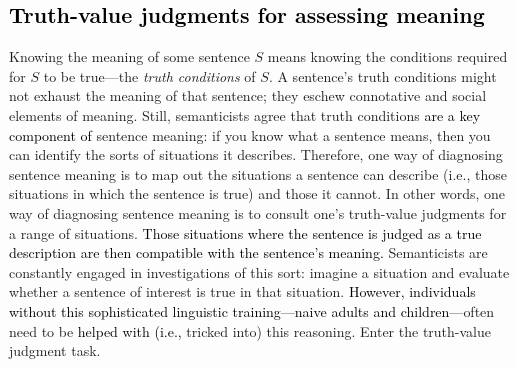 \documentclass[cm]{glossa}
\newcommand{\gcs}[1]{\textcolor{blue}{[gcs: #1]}}
\newcommand{\lsp}[1]{\textcolor{red}{[lsp: #1]}}
\newcommand{\lp}[1]{\textcolor{black}{#1}} %
\begin{document}
\subsection{\lp{Truth-value judgments for assessing meaning}}
Knowing the meaning of some sentence $S$ means knowing the conditions required for $S$ to be true---the \emph{truth conditions} of $S$. A sentence's truth conditions might not exhaust the meaning of that sentence; they eschew connotative and social elements of meaning.  
Still, semanticists agree that truth conditions %
\lp{are a key component of}
sentence meaning: if you know what a sentence means, then you can identify the sorts of situations it describes. Therefore, one way of diagnosing sentence meaning is to map out the situations a sentence can describe (i.e., those situations in which the sentence is true) and those it cannot. In other words, one way of diagnosing sentence meaning is to consult one's truth-value judgments for a range of situations. 
\lp{Those situations where the sentence is judged as a true description are then compatible with the sentence's meaning.}
Semanticists are constantly engaged in investigations of this sort: imagine a situation and evaluate whether a sentence of interest is true in that situation. 
\lp{However, individuals without this sophisticated linguistic training---naive adults and children---}often need to be 
\lp{helped with (i.e.,} tricked into)
this reasoning. 
Enter the truth-value judgment task.
\end{document}
